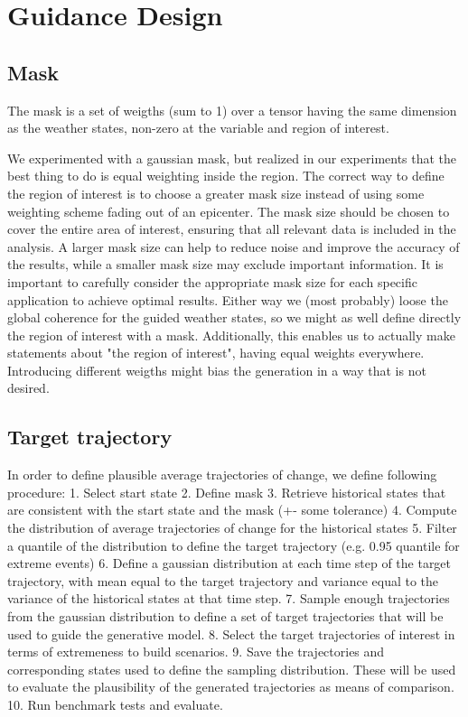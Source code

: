 \chapter{Guidance Design}

\section{Mask}

The mask is a set of weigths (sum to 1) over a tensor having the same dimension as the weather states, non-zero at the variable and region of interest.

We experimented with a gaussian mask, but realized in our experiments that the best thing to do is equal weighting inside the region.
The correct way to define the region of interest is to choose a greater mask size instead of using some weighting scheme fading out of an epicenter. The mask size should be chosen to cover the entire area of interest, ensuring that all relevant data is included in the analysis. A larger mask size can help to reduce noise and improve the accuracy of the results, while a smaller mask size may exclude important information. It is important to carefully consider the appropriate mask size for each specific application to achieve optimal results.
Either way we (most probably) loose the global coherence for the guided weather states, so we might as well define directly the region of interest with a mask. 
Additionally, this enables us to actually make statements about "the region of interest",
having equal weights everywhere.
Introducing different weigths might bias the generation in a way that is not desired.



\section{Target trajectory}

In order to define plausible average trajectories of change, we define following procedure:
1. Select start state
2. Define mask
3. Retrieve historical states that are consistent with the start state and the mask (+- some tolerance)
4. Compute the distribution of average trajectories of change for the historical states
5. Filter a quantile of the distribution to define the target trajectory (e.g. 0.95 quantile for extreme events)
6. Define a gaussian distribution at each time step of the target trajectory, with mean equal to the target trajectory and variance equal to the variance of the historical states at that time step.
7. Sample enough trajectories from the gaussian distribution to define a set of target trajectories that will be used to guide the generative model.
8. Select the target trajectories of interest in terms of extremeness to build scenarios.
9. Save the trajectories and corresponding states used to define the sampling distribution. These will be used to evaluate the plausibility of the generated trajectories as means of comparison.
10. Run benchmark tests and evaluate.

